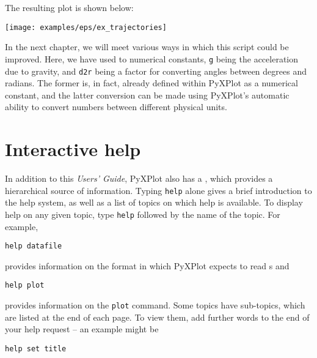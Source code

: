 {{\newline
{}\newline
{}\newline
{}
}
\nlscf
The resulting plot is shown below:
\nlscf
\begin{center}
\texttt{[image: examples/eps/ex\_trajectories]}
\end{center}
\nlscf
In the next chapter, we will meet various ways in which this script could be
improved. Here, we have used to numerical constants, {\tt g} being the
acceleration due to gravity, and {\tt d2r} being a factor for converting angles
between degrees and radians.  The former is, in fact, already defined within
PyXPlot as a numerical constant, and the latter conversion can be made using
PyXPlot's automatic ability to convert numbers between different physical
units.
}

\section{Interactive help}

In addition to this {\it Users' Guide}, PyXPlot also has a ,
which provides a hierarchical source of information. Typing {\tt help} alone
gives a brief introduction to the help system, as well as a list of topics on
which help is available. To display help on any given topic, type {\tt help}
followed by the name of the topic. For example,

\begin{verbatim}
help datafile
\end{verbatim}

\noindent provides information on the format in which PyXPlot expects to read
\datafile s and

\begin{verbatim}
help plot
\end{verbatim}

\noindent provides information on the {\tt plot} command.  Some topics have
sub-topics, which are listed at the end of each page. To view them, add further
words to the end of your help request -- an example might be

\begin{verbatim}
help set title
\end{verbatim}

